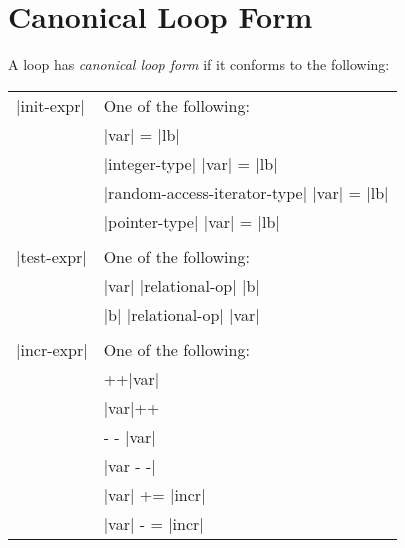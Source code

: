 \section{Canonical Loop Form}
\label{sec:Canonical Loop Form}
\begin{ccppspecific}
A loop has \emph{canonical loop form} if it conforms to the following:

\medskip
\nolinenumbers
\renewcommand{\arraystretch}{1.0}
\tablelasttail{\hline}
\begin{supertabular}{ p{0.8in} p{4.5in}}
    {\plc|init-expr|} & One of the following:\\
    & {\plc|var|} = {\plc|lb|}\\
    & {\plc|integer-type|} {\plc|var|} = {\plc|lb|}\\
    & {\plc|random-access-iterator-type|} {\plc|var|} = {\plc|lb|}\\
    & {\plc|pointer-type|} {\plc|var|} = {\plc|lb|}\\
    & \\
    {\plc|test-expr|} & One of the following:\\
    & {\plc|var|} {\plc|relational-op|} {\plc|b|}\\
    & {\plc|b|} {\plc|relational-op|} {\plc|var|}\\
    & \\
    {\plc|incr-expr|} & One of the following:\\
    & ++{\plc|var|}\\
    & {\plc|var|}++\\
    & {-} {-} {\plc|var|}\\
    & {\plc|var {-} {-}|}\\
    & {\plc|var|} += {\plc|incr|}\\
    & {\plc|var|} {-} = {\plc|incr|}\\

\end{supertabular}
\end{ccppspecific}
